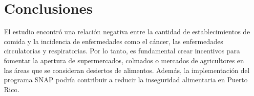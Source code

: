 \documentclass[10pt, oneside]{article}
\begin{document}
\section{Conclusiones}

El estudio encontró una relación negativa entre la cantidad de establecimientos de comida y la incidencia de enfermedades como el cáncer, las enfermedades
circulatorias y respiratorias. Por lo tanto, es fundamental crear incentivos para fomentar la apertura de supermercados, colmados o mercados de agricultores
en las áreas que se consideran desiertos de alimentos. Además, la implementación del programa SNAP podría contribuir a reducir la inseguridad alimentaria en Puerto Rico.
\end{document}
